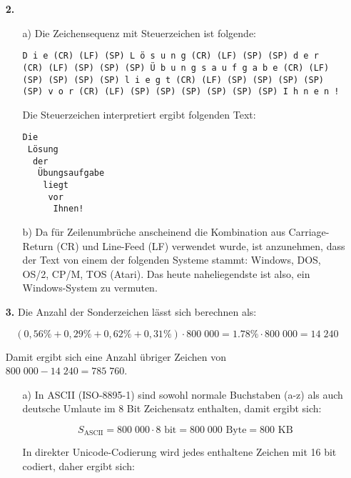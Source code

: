 \documentclass[a4paper,10pt]{scrartcl}
\begin{document}
\begin{enumerate}
    \item[\textbf{2.}]
        \begin{enumerate}
            \item[a)]
                Die Zeichensequenz mit Steuerzeichen ist folgende:

                \begin{verbatim}
D i e (CR) (LF) (SP) L ö s u n g (CR) (LF) (SP) (SP) d e r
(CR) (LF) (SP) (SP) (SP) Ü b u n g s a u f g a b e (CR) (LF)
(SP) (SP) (SP) (SP) l i e g t (CR) (LF) (SP) (SP) (SP) (SP)
(SP) v o r (CR) (LF) (SP) (SP) (SP) (SP) (SP) (SP) I h n e n !
                \end{verbatim}

                Die Steuerzeichen interpretiert ergibt folgenden Text:
                \begin{verbatim}
Die
 Lösung
  der
   Übungsaufgabe
    liegt
     vor
      Ihnen!
                \end{verbatim}

            \item[b)]
                Da für Zeilenumbrüche anscheinend die Kombination aus Carriage-Return (CR) und Line-Feed (LF)
                verwendet wurde, ist anzunehmen, dass der Text von einem der folgenden Systeme stammt:
                Windows, DOS, OS/2, CP/M, TOS (Atari). Das heute naheliegendste ist also, ein Windows-System zu vermuten.
        \end{enumerate}

    \item[\textbf{3.}]
        Die Anzahl der Sonderzeichen lässt sich berechnen als:

        $$(0,56\% + 0,29\% + 0,62\% + 0,31\%) \cdot 800\;000 = 1.78\% \cdot 800\;000 = 14\;240$$

        Damit ergibt sich eine Anzahl übriger Zeichen von $800\;000 - 14\;240 = 785\;760$.

        \begin{enumerate}
            \item[a)]
                In ASCII (ISO-8895-1) sind sowohl normale Buchstaben (a-z) als auch deutsche Umlaute im 8 Bit Zeichensatz
                enthalten, damit ergibt sich:

                $$S_{\text{ASCII}} = 800\;000 \cdot 8 \text{ bit} = 800\;000 \text{ Byte} = 800 \text{ KB}$$

                In direkter Unicode-Codierung wird jedes enthaltene Zeichen mit 16 bit codiert, daher ergibt sich:


\end{enumerate}
\end{enumerate}
\end{document}

